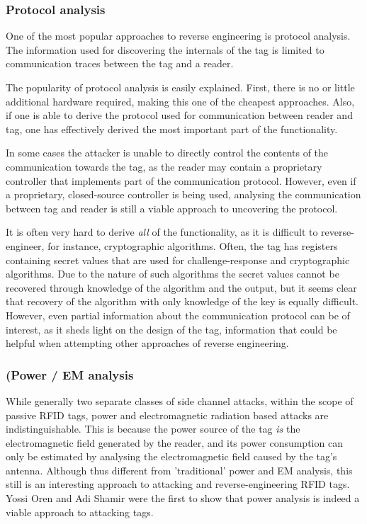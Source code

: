 \documentclass{llncs}
\begin{document}
\subsubsection{Protocol analysis}
One of the most popular approaches to reverse engineering is protocol analysis. The information used for discovering the internals of the tag is limited to communication traces between the tag and a reader. 

The popularity of protocol analysis is easily explained. First, there is no or little additional hardware required, making this one of the cheapest approaches. Also, if one is able to derive the protocol used for communication between reader and tag, one has effectively derived the most important part of the functionality. 

In some cases the attacker is unable to directly control the contents of the communication towards the tag, as the reader may contain a proprietary controller that implements part of the communication protocol. However, even if a proprietary, closed-source controller is being used, analysing the communication between tag and reader is still a viable approach to uncovering the protocol\cite{web:snifferonly}. 

It is often very hard to derive \emph{all} of the functionality, as it is difficult to reverse-engineer, for instance, cryptographic algorithms. Often, the tag has registers containing secret values that are used for challenge-response and cryptographic algorithms. Due to the nature of such algorithms the secret values cannot be recovered through knowledge of the algorithm and the output, but it seems clear that recovery of the algorithm with only knowledge of the key is equally difficult. However, even partial information about the communication protocol can be of interest, as it sheds light on the design of the tag, information that could be helpful when attempting other approaches of reverse engineering. 

\subsubsection{(Power / EM analysis}
\label{sec:approaches-power}
While generally two separate classes of side channel attacks, within the scope of passive RFID tags, power and electromagnetic radiation based attacks are indistinguishable. This is because the power source of the tag \emph{is} the electromagnetic field generated by the reader, and its power consumption can only be estimated by analysing the electromagnetic field caused by the tag's antenna. Although thus different from 'traditional' power and EM analysis, this still is an interesting approach to attacking and reverse-engineering RFID tags. Yossi Oren and Adi Shamir were the first to show that power analysis is indeed a viable approach to attacking tags\cite{doc:yossen-shamir_poweranalysis}. 
\end{document}
